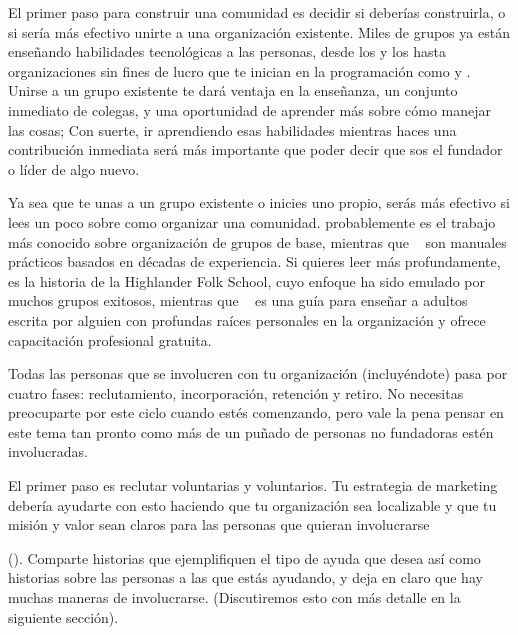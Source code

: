 El primer paso para construir una comunidad es decidir si deberías construirla,
o si sería más efectivo unirte a una organización existente.
Miles de grupos ya están enseñando habilidades tecnológicas a las personas,
desde los 
y los 
hasta organizaciones sin fines de lucro que te inician en la programación como
y .
Unirse a un grupo existente te dará ventaja en la enseñanza,
un conjunto inmediato de colegas,
y una oportunidad de aprender más sobre cómo manejar las cosas;
Con suerte,
ir aprendiendo esas habilidades mientras haces una contribución inmediata
será más importante que poder decir que
sos el fundador o líder de algo nuevo.

Ya sea que te unas a un grupo existente o inicies uno propio,
serás más efectivo si lees un poco sobre como organizar una comunidad.
\cite{Alin1989,Lake2018} probablemente es el trabajo más conocido sobre organización de grupos de base,
mientras que ~\cite{Brow2007,Midw2010,Lake2018} son manuales prácticos basados ​​en décadas de experiencia.
Si quieres leer más profundamente,
\cite{Adam1975} es la historia de la Highlander Folk School,
cuyo enfoque ha sido emulado por muchos grupos exitosos,
mientras que ~\cite{Spal2014} es una guía para enseñar a adultos
escrita por alguien con profundas raíces personales en la organización
y 
ofrece capacitación profesional gratuita.


Todas las personas que se involucren con tu organización
(incluyéndote)
pasa por cuatro fases:
reclutamiento, incorporación, retención y retiro.
No necesitas preocuparte por este ciclo cuando estés comenzando,
pero vale la pena pensar en este tema
tan pronto como más de un puñado de personas no fundadoras estén involucradas.

El primer paso es reclutar voluntarias y voluntarios.
Tu estrategia de marketing debería ayudarte con esto haciendo que tu organización sea localizable
y que tu misión y valor sean claros
para las personas que quieran involucrarse

().
Comparte historias que ejemplifiquen el tipo de ayuda que desea
así como historias sobre las personas a las que estás ayudando,
y deja en claro que hay muchas maneras de involucrarse.
(Discutiremos esto con más detalle en la siguiente sección).

